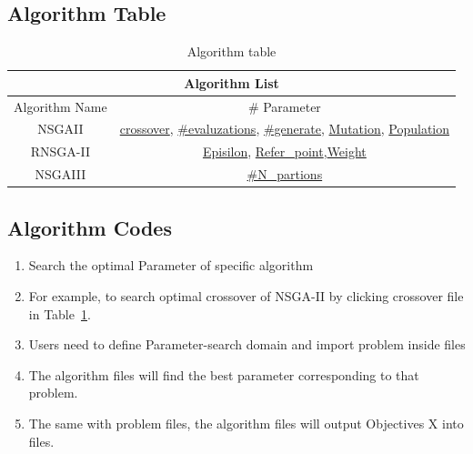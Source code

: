 \documentclass{article}
\begin{document}
\subsection{Algorithm Table}
\begin{table}[h]
    \caption{Algorithm table}  
    \begin{center}
    \begin{tabular}{|c|c|}
        \hline
        \multicolumn{2}{|c|}{\bf{Algorithm List}} \\
        \hline
        Algorithm Name     & \# Parameter\\

        \hline
        NSGAII & \href{https://github.com/wuyoscar/MOOP/blob/master/Loopfiles/algorithmns/NSGA-II/NSGA-II_crossover.py}{crossover}, \href{https://github.com/wuyoscar/MOOP/blob/master/Loopfiles/algorithmns/NSGA-II/NSGA-II_evals.py}{\#evaluzations}, 
        \href{https://github.com/wuyoscar/MOOP/blob/master/Loopfiles/algorithmns/NSGA-II/NSGA-II_generation.py}{\#generate},
        \href{https://github.com/wuyoscar/MOOP/blob/master/Loopfiles/algorithmns/NSGA-II/NSGA-II_mutation.py}{Mutation},
        \href{https://github.com/wuyoscar/MOOP/blob/master/Loopfiles/algorithmns/NSGA-II/NSGA-II_popsize.py}{Population}\\
        \hline
        RNSGA-II & \href{https://github.com/wuyoscar/MOOP/blob/master/Loopfiles/algorithmns/RNSGA-II/RNSGA-II_episilon.py}{Episilon}, \href{https://github.com/wuyoscar/MOOP/blob/master/Loopfiles/algorithmns/RNSGA-II/RNSGA-II_refer_points.py}{Refer\_point},\href{https://github.com/wuyoscar/MOOP/blob/master/Loopfiles/algorithmns/RNSGA-II/RNSGA-II_weight.py}{Weight}  \\ 
        \hline
        NSGAIII & \href{https://github.com/wuyoscar/MOOP/blob/master/Loopfiles/algorithmns/NSGA-III/NSGA-III_n_partions.py}{\#N\_partions} \\
        \hline
        

        

    \end{tabular}
    \end{center}
    \label{table:algorithm}
    \end{table}
\subsection{Algorithm Codes}
\begin{enumerate}
    \item Search the optimal Parameter of specific algorithm
    \item For example, to search optimal crossover of NSGA-II by clicking crossover file in Table~\ref*{table:algorithm}.
    \item Users need to define Parameter-search domain and import problem inside files
    \item The algorithm files will find the best parameter corresponding to that problem. 
    \item The same with problem files, the algorithm files will output Objectives X into files.
\end{enumerate}
\end{document}
